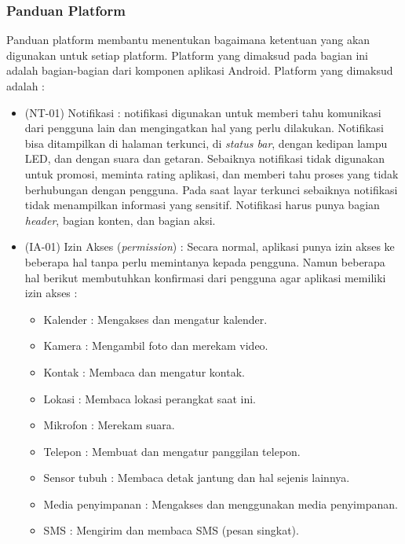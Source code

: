 \subsubsection{Panduan Platform}
Panduan platform membantu menentukan bagaimana ketentuan yang akan digunakan untuk setiap platform. Platform yang dimaksud pada bagian ini adalah bagian-bagian dari komponen aplikasi Android. Platform yang dimaksud adalah :
\begin{itemize}
    \item (NT-01) Notifikasi : notifikasi digunakan untuk memberi tahu komunikasi dari pengguna lain dan mengingatkan hal yang perlu dilakukan. Notifikasi bisa ditampilkan di halaman terkunci, di \textit{status bar}, dengan kedipan lampu LED, dan dengan suara dan getaran. Sebaiknya notifikasi tidak digunakan untuk promosi, meminta rating aplikasi, dan memberi tahu proses yang tidak berhubungan dengan pengguna. Pada saat layar terkunci sebaiknya notifikasi tidak menampilkan informasi yang sensitif. Notifikasi harus punya bagian \textit{header}, bagian konten, dan bagian aksi. 
    \item (IA-01) Izin Akses (\textit{permission}) : Secara normal, aplikasi punya izin akses ke beberapa hal tanpa perlu memintanya kepada pengguna. Namun beberapa hal berikut membutuhkan konfirmasi dari pengguna agar aplikasi memiliki izin akses :
    \begin{itemize} \label{subs:izin}
        \item Kalender : Mengakses dan mengatur kalender.
        \item Kamera : Mengambil foto dan merekam video.
        \item Kontak : Membaca dan mengatur kontak.
        \item Lokasi : Membaca lokasi perangkat saat ini.
        \item Mikrofon : Merekam suara.
        \item Telepon : Membuat dan mengatur panggilan telepon.
        \item Sensor tubuh : Membaca detak jantung dan hal sejenis lainnya.
        \item Media penyimpanan : Mengakses dan menggunakan media penyimpanan.
        \item SMS : Mengirim dan membaca SMS (pesan singkat).
    \end{itemize}
\end{itemize}


